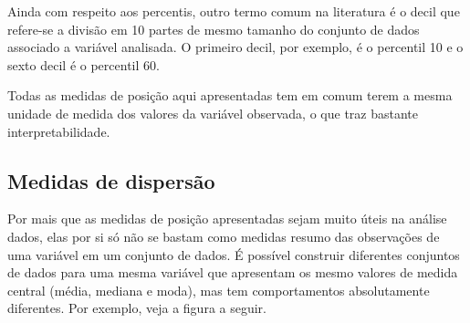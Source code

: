 \documentclass[
  letterpaper,
  DIV=11,
  numbers=noendperiod]{scrreprt}
\begin{document}
Ainda com respeito aos percentis, outro termo comum na literatura é o
decil que refere-se a divisão em 10 partes de mesmo tamanho do conjunto
de dados associado a variável analisada. O primeiro decil, por exemplo,
é o percentil 10 e o sexto decil é o percentil 60.

Todas as medidas de posição aqui apresentadas tem em comum terem a mesma
unidade de medida dos valores da variável observada, o que traz bastante
interpretabilidade.

\hypertarget{medidas-de-dispersuxe3o}{%
\subsection{Medidas de dispersão}\label{medidas-de-dispersuxe3o}}

Por mais que as medidas de posição apresentadas sejam muito úteis na
análise dados, elas por si só não se bastam como medidas resumo das
observações de uma variável em um conjunto de dados. É possível
construir diferentes conjuntos de dados para uma mesma variável que
apresentam os mesmo valores de medida central (média, mediana e moda),
mas tem comportamentos absolutamente diferentes. Por exemplo, veja a
figura a seguir.
\end{document}
